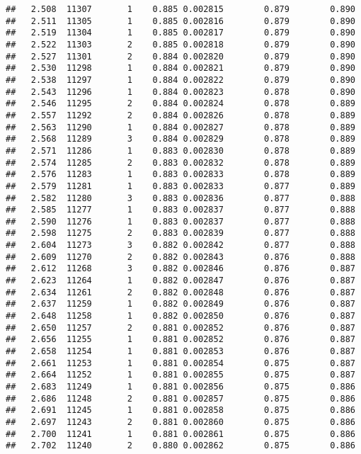 \documentclass[
]{book}
\begin{document}
\begin{verbatim}
##   2.508  11307       1    0.885 0.002815        0.879        0.890
##   2.511  11305       1    0.885 0.002816        0.879        0.890
##   2.519  11304       1    0.885 0.002817        0.879        0.890
##   2.522  11303       2    0.885 0.002818        0.879        0.890
##   2.527  11301       2    0.884 0.002820        0.879        0.890
##   2.530  11298       1    0.884 0.002821        0.879        0.890
##   2.538  11297       1    0.884 0.002822        0.879        0.890
##   2.543  11296       1    0.884 0.002823        0.878        0.890
##   2.546  11295       2    0.884 0.002824        0.878        0.889
##   2.557  11292       2    0.884 0.002826        0.878        0.889
##   2.563  11290       1    0.884 0.002827        0.878        0.889
##   2.568  11289       3    0.884 0.002829        0.878        0.889
##   2.571  11286       1    0.883 0.002830        0.878        0.889
##   2.574  11285       2    0.883 0.002832        0.878        0.889
##   2.576  11283       1    0.883 0.002833        0.878        0.889
##   2.579  11281       1    0.883 0.002833        0.877        0.889
##   2.582  11280       3    0.883 0.002836        0.877        0.888
##   2.585  11277       1    0.883 0.002837        0.877        0.888
##   2.590  11276       1    0.883 0.002837        0.877        0.888
##   2.598  11275       2    0.883 0.002839        0.877        0.888
##   2.604  11273       3    0.882 0.002842        0.877        0.888
##   2.609  11270       2    0.882 0.002843        0.876        0.888
##   2.612  11268       3    0.882 0.002846        0.876        0.887
##   2.623  11264       1    0.882 0.002847        0.876        0.887
##   2.634  11261       2    0.882 0.002848        0.876        0.887
##   2.637  11259       1    0.882 0.002849        0.876        0.887
##   2.648  11258       1    0.882 0.002850        0.876        0.887
##   2.650  11257       2    0.881 0.002852        0.876        0.887
##   2.656  11255       1    0.881 0.002852        0.876        0.887
##   2.658  11254       1    0.881 0.002853        0.876        0.887
##   2.661  11253       1    0.881 0.002854        0.875        0.887
##   2.664  11252       1    0.881 0.002855        0.875        0.887
##   2.683  11249       1    0.881 0.002856        0.875        0.886
##   2.686  11248       2    0.881 0.002857        0.875        0.886
##   2.691  11245       1    0.881 0.002858        0.875        0.886
##   2.697  11243       2    0.881 0.002860        0.875        0.886
##   2.700  11241       1    0.881 0.002861        0.875        0.886
##   2.702  11240       2    0.880 0.002862        0.875        0.886

\end{verbatim}
\end{document}
